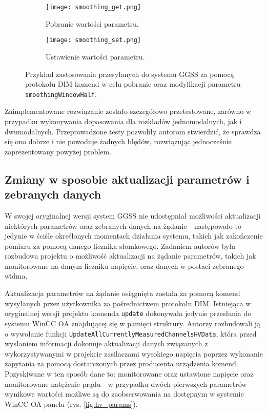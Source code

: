 \begin{figure}[H]
\centering

\begin{subfigure}{0.45\textwidth}
\centering
\texttt{[image: smoothing\_get.png]}
\caption{Pobranie wartości parametru.}
\label{fig:smoothing_get}
\end{subfigure}
\begin{subfigure}{0.45\textwidth}
\centering
\texttt{[image: smoothing\_set.png]}
\caption{Ustawienie wartości parametru.}
\label{fig:smoothing_set}
\end{subfigure}

\caption{Przykład zastosowania przesyłanych do systemu GGSS za pomocą protokołu DIM komend w celu pobranie oraz modyfikacji parametru \lstinline{smoothingWindowHalf}.}
\label{fig:smoothing_param}
\end{figure}

Zaimplementowane rozwiązanie zostało szczegółowo przetestowane, zarówno w przypadku wykonywania dopasowania dla rozkładów jednomodalnych, jak i dwumodalnych. Przeprowadzone testy pozwoliły autorom stwierdzić, że sprawdza się ono dobrze i nie powoduje żadnych błędów, rozwiązując jednocześnie zaprezentowany powyżej problem.


\clearpage
\subsection{Zmiany w sposobie aktualizacji parametrów i zebranych danych}
W swojej oryginalnej wersji system GGSS nie udostępniał możliwości aktualizacji niektórych parametrów oraz zebranych danych na żądanie - następowało to jedynie w ściśle określonych momentach działania systemu, takich jak zakończenie pomiaru za pomocą danego licznika słomkowego. Zadaniem autorów była rozbudowa projektu o możliwość aktualizacji na żądanie parametrów, takich jak monitorowane na danym liczniku napięcie, oraz danych w postaci zebranego widma.

Aktualizacja parametrów na żądanie osiągnięta została za pomocą komend wysyłanych przez użytkownika za pośrednictwem protokołu DIM. Istniejąca w oryginalnej wersji projektu komenda \lstinline{update} dokonywała jedynie przesłania do systemu WinCC OA znajdującej się w pamięci struktury. Autorzy rozbudowali ją o wywołanie funkcji \lstinline{UpdateAllCurrentlyMeasuredChannelsHVData}, która przed wysłaniem informacji dokonuje aktualizacji danych związanych z wykorzystywanymi w projekcie zasilaczami wysokiego napięcia poprzez wykonanie zapytania za pomocą dostarczonych przez producenta urządzenia komend. Pozyskiwane w ten sposób dane to: monitorowane oraz ustawione napięcie oraz monitorowane natężenie prądu - w przypadku dwóch pierwszych parametrów wynikowe wartości możliwe są do zaobserwowania na dostępnym w systemie WinCC OA panelu (rys. \ref{fig:hv_params}).

